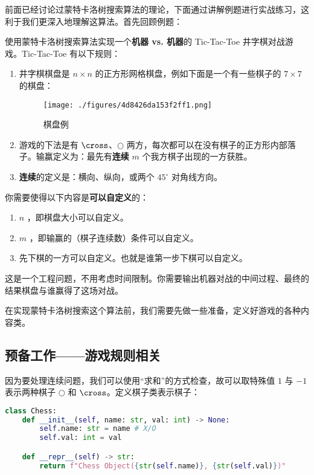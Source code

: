 

前面已经讨论过蒙特卡洛树搜索算法的理论，下面通过讲解例题进行实战练习，这利于我们更深入地理解这算法。首先回顾例题：
\begin{example}{}
使用蒙特卡洛树搜索算法实现一个\textbf{机器 vs. 机器}的 Tic-Tac-Toe 井字棋对战游戏。Tic-Tac-Toe 有以下规则：
\begin{enumerate}
\item 井字棋棋盘是 $n \times n$ 的正方形网格棋盘，例如下面是一个有一些棋子的 $7 \times 7$ 的棋盘：
\begin{figure}[ht]
\centering
\texttt{[image: ./figures/4d8426da153f2ff1.png]}
\caption{棋盘例} \label{fig_MCTSci_2}
\end{figure}
\item 游戏的下法是有 $\cross$、$\bigcirc$ 两方，每次都可以在没有棋子的正方形内部落子。输赢定义为：最先有\textbf{连续} $m$ 个我方棋子出现的一方获胜。
\item \textbf{连续}的定义是：横向、纵向，或两个 $45^\circ$ 对角线方向。
\end{enumerate}

你需要使得以下内容是\textbf{可以自定义}的：
\begin{enumerate}
\item $n$ ，即棋盘大小可以自定义。
\item $m$ ，即输赢的（棋子连续数）条件可以自定义。
\item 先下棋的一方可以自定义。也就是谁第一步下棋可以自定义。
\end{enumerate}

这是一个工程问题，不用考虑时间限制。你需要输出机器对战的中间过程、最终的结果棋盘与谁赢得了这场对战。
\end{example}
在实现蒙特卡洛树搜索这个算法前，我们需要先做一些准备，定义好游戏的各种内容类。
\subsection{预备工作——游戏规则相关}
因为要处理连续问题，我们可以使用“求和”的方式检查，故可以取特殊值 $1$ 与 $-1$ 表示两种棋子 $\bigcirc$ 和 $\cross$。定义棋子类表示棋子：
\begin{lstlisting}[language=python]
class Chess:
    def __init__(self, name: str, val: int) -> None:
        self.name: str = name # X/O
        self.val: int = val

    def __repr__(self) -> str:
        return f"Chess Object({str(self.name)}, {str(self.val)})"
\end{lstlisting}

